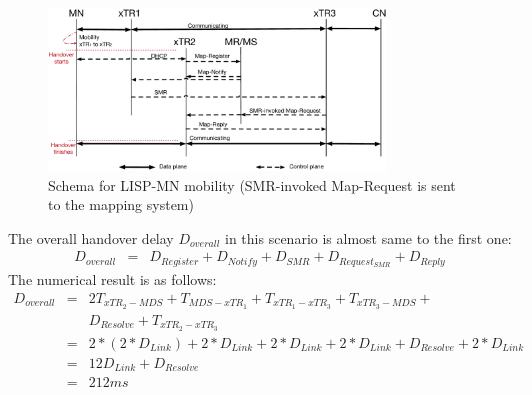 \begin{figure}[!t]
	\centering
	\includegraphics[width=0.8\textwidth]{Pics/Mobility_xTR_schema_SMR_simplify}
	\caption{Schema for LISP-MN mobility (SMR-invoked Map-Request is sent to the mapping system)}
	\label{sim_schema_xTR}
\end{figure}

The overall handover delay $D_{overall}$ in this scenario is almost same to the first one:
\begin{eqnarray}
D_{overall} &=& D_{Register} + D_{Notify} + D_{SMR} + D_{Request_{SMR}} + D_{Reply} 
\end{eqnarray}
The numerical result is as follows:
\begin{eqnarray}
D_{overall} &=& 2T_{xTR_2-MDS} + T_{MDS-xTR_1} + T_{xTR_1-xTR_3} + T_{xTR_3-MDS} + \nonumber \\
& & D_{Resolve} + T_{xTR_2-xTR_3} \nonumber \\
&=& 2* (2*D_{Link}) + 2*D_{Link} + 2*D_{Link} + 2*D_{Link} + D_{Resolve} + 2*D_{Link} \nonumber \\
&=& 12D_{Link} + D_{Resolve}  \nonumber \\
&=& 212 ms \nonumber
\end{eqnarray}

